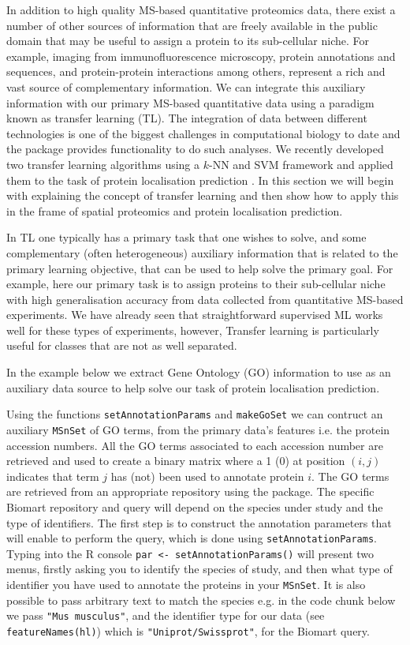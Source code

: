 In addition to high quality MS-based quantitative proteomics data,
there exist a number of other sources of information that are freely
available in the public domain that may be useful to assign a protein
to its sub-cellular niche. For example, imaging from
immunofluorescence microscopy, protein annotations and sequences, and
protein-protein interactions among others, represent a rich and vast
source of complementary information. We can integrate this auxiliary
information with our primary MS-based quantitative data using a
paradigm known as transfer learning (TL). The integration of data
between different technologies is one of the biggest challenges in
computational biology to date and the  package
provides functionality to do such analyses. We recently developed two
transfer learning algorithms using a $k$-NN and SVM framework and
applied them to the task of protein localisation prediction
\cite{Breckels:2016}. In this section we will begin with explaining
the concept of transfer learning and then show how to apply this in
the frame of spatial proteomics and protein localisation prediction.

In TL one typically has a primary task that one wishes to solve, and
some complementary (often heterogeneous) auxiliary information that is
related to the primary learning objective, that can be used to help
solve the primary goal. For example, here our primary task is to
assign proteins to their sub-cellular niche with high generalisation
accuracy from data collected from quantitative MS-based experiments.
We have already seen that straightforward supervised ML works well for
these types of experiments, however, Transfer learning is particularly
useful for classes that are not as well separated.

In the example below we extract Gene Ontology (GO) information to use
as an auxiliary data source to help solve our task of protein
localisation prediction.

Using the functions \texttt{setAnnotationParams} and
\texttt{makeGoSet} we can contruct an auxiliary \texttt{MSnSet} of GO
terms, from the primary data's features i.e. the protein accession
numbers. All the GO terms associated to each accession number are
retrieved and used to create a binary matrix where a 1 (0) at position
$(i, j)$ indicates that term $j$ has (not) been used to annotate
protein $i$. The GO terms are retrieved from an appropriate repository
using the  package. The specific Biomart repository
and query will depend on the species under study and the type of
identifiers. The first step is to construct the annotation parameters
that will enable to perform the query, which is done using
\texttt{setAnnotationParams}. Typing into the R console \texttt{par <-
  setAnnotationParams()} will present two menus, firstly asking you to
identify the species of study, and then what type of identifier you
have used to annotate the proteins in your \texttt{MSnSet}. It is also
possible to pass arbitrary text to match the species e.g. in the code
chunk below we pass \texttt{"Mus musculus"}, and the identifier type
for our data (see \texttt{featureNames(hl)}) which is
\texttt{"Uniprot/Swissprot"}, for the Biomart query.

